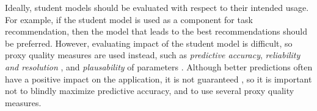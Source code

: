 Ideally, student models should be evaluated with respect to their intended usage.
For example, if the student model is used as a component for task recommendation,
then the model that leads to the best recommendations should be preferred.
However, evaluating impact of the student model is difficult, %
so proxy quality measures are used instead,
such as \emph{predictive accuracy}, %
\emph{reliability and resolution} %
\cite{pelanek-evaluation-student-models}, %
and \emph{plausability} of parameters \cite{learner-models-integration-skills}.
Although better predictions often have a positive impact on the application,
it is not guaranteed \cite{evaluation-leopard},
so it is important not to blindly maximize predictive accuracy,
and to use several proxy quality measures.  %

